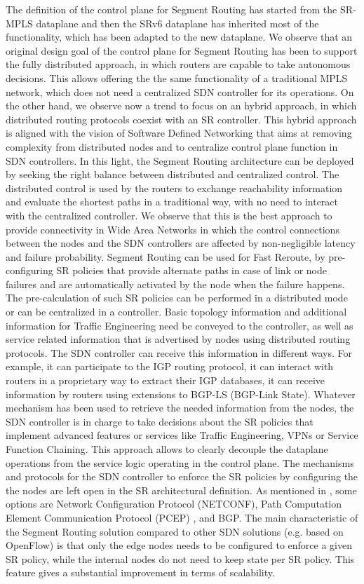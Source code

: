 The definition of the control plane for Segment Routing has started from the SR-MPLS dataplane and then the SRv6 dataplane has inherited most of the functionality, which has been adapted to the new dataplane. We observe that an original design goal of the control plane for Segment Routing has been to support the fully distributed approach, in which routers are capable to take autonomous decisions. This allows offering the the same functionality of a traditional MPLS network, which does not need a centralized SDN controller for its operations. On the other hand, we observe now a trend to focus on an hybrid approach, in which distributed routing protocols coexist with an SR controller. This hybrid approach is aligned with the vision of Software Defined Networking that aims at removing complexity from distributed nodes and to centralize control plane function in SDN controllers. In this light, the Segment Routing architecture can be deployed by seeking the right balance between distributed and centralized control. The distributed control is used by the routers to exchange reachability information and evaluate the shortest paths in a traditional way, with no need to interact with the centralized controller. We observe that this is the best approach to provide connectivity in Wide Area Networks in which the control connections between the nodes and the SDN controllers are affected by non-negligible latency and failure probability. Segment Routing can be used for Fast Reroute, by pre-configuring SR policies that provide alternate paths in case of link or node failures and are automatically activated by the node when the failure happens. The pre-calculation of such SR policies can be performed in a distributed mode or can be centralized in a controller. Basic topology information and additional information for Traffic Engineering need be conveyed to the controller, as well as service related information that is advertised by nodes using distributed routing protocols. The SDN controller can receive this information in different ways. For example, it can participate to the IGP routing protocol, it can interact with routers in a proprietary way to extract their IGP databases, it can receive information by routers using extensions to BGP-LS (BGP-Link State). Whatever mechanism has been used to retrieve the needed information from the nodes, the SDN controller is in charge to take decisions about the SR policies that implement advanced features or services like Traffic Engineering, VPNs or Service Function Chaining. This approach allows to clearly decouple the dataplane operations from the service logic operating in the control plane. The mechanisms and protocols for the SDN controller to enforce the SR policies by configuring the the nodes are left open in the SR architectural definition. As mentioned in \cite{rfc8402}, some options are Network Configuration Protocol (NETCONF), Path Computation Element Communication Protocol (PCEP) \cite{ietf-pce-segment-routing}, and BGP. The main characteristic of the Segment Routing solution compared to other SDN solutions (e.g. based on OpenFlow) is that only the edge nodes needs to be configured to enforce a given SR policy, while the internal nodes do not need to keep state per SR policy. This feature gives a substantial improvement in terms of scalability. 

